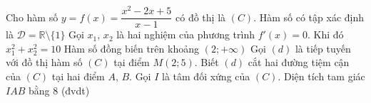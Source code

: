 \begin{ex}%
	Cho hàm số $y = f(x) = \dfrac{x^2 - 2x + 5}{x - 1}$ có đồ thị là $(C)$.
	\choiceTF
	{\True Hàm số có tập xác định là $\mathscr{D} = \mathbb{R} \setminus \{1\}$}
	{\True Gọi $x_1$, $x_2$ là hai nghiệm của phương trình $f'(x) = 0$. Khi đó $x_1^2 + x_2^2 = 10$}
	{Hàm số đồng biến trên khoảng $(2;+\infty)$}
	{\True Gọi $(d)$ là tiếp tuyến với đồ thị hàm số $(C)$ tại điểm $M(2;5)$. Biết $(d)$ cắt hai đường tiệm cận của $(C)$ tại hai điểm $A$, $B$. Gọi $I$ là tâm đối xứng của $(C)$. Diện tích tam giác $IAB$ bằng $8$ (đvdt)}
\end{ex}

